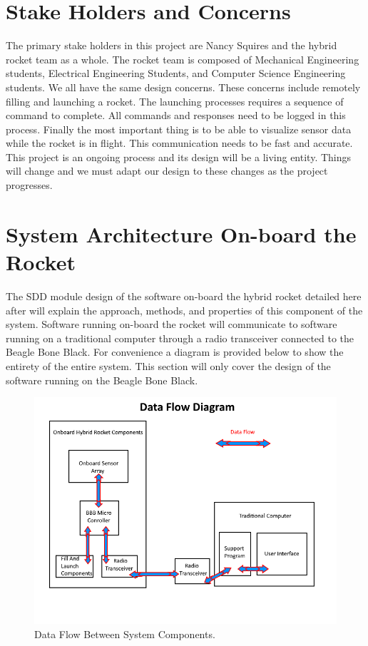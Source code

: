 \documentclass[10pt,draftclsnofoot,onecolumn,compsoc]{IEEEtran}
\begin{document}
\section{Stake Holders and Concerns}
The primary stake holders in this project are Nancy Squires and the hybrid rocket team as a whole. The rocket team is composed of Mechanical Engineering students, Electrical Engineering Students, and Computer Science Engineering students. We all have the same design concerns. These concerns include remotely filling and launching a rocket. The launching processes requires a sequence of command to complete. All commands and responses need to be logged in this process. Finally the most important thing is to be able to visualize sensor data while the rocket is in flight. This communication needs to be fast and accurate. This project is an ongoing process and its design will be a living entity. Things will change and we must adapt our design to these changes as the project progresses.
\section{System Architecture On-board the Rocket }	
The SDD module design of the software on-board the hybrid rocket detailed here after will explain the approach, methods, and properties of this component of the system. Software running on-board the rocket will communicate to software running on a traditional computer through a radio transceiver connected to the Beagle Bone Black. For convenience a diagram is provided below to show the entirety of the entire system. This section will  only cover the design of the software running on the Beagle Bone Black. \par

\begin{figure}[!ht]
  \caption{Data Flow Between System Components.}
  \centering
	\includegraphics[scale=.85]{RocketBlockDiagram}
\end{figure}
\FloatBarrier
\end{document}
